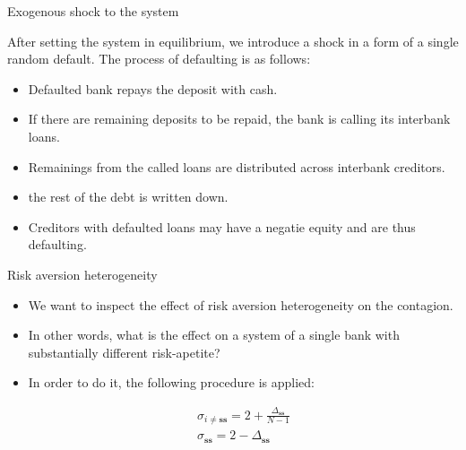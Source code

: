 \documentclass{beamer}
\begin{document}
\begin{frame}{Exogenous shock to the system}

    After setting the system in equilibrium, we introduce a shock in a form of a single random default. The process of defaulting is as follows:

    \begin{itemize}
        \item Defaulted bank repays the deposit with cash.
        \item If there are remaining deposits to be repaid, the bank is calling its interbank loans.
        \item Remainings from the called loans are distributed across interbank creditors.
        \item the rest of the debt is written down.
        \item Creditors with defaulted loans may have a negatie equity and are thus defaulting. 
    \end{itemize}
    
\end{frame}

\begin{frame}{Risk aversion heterogeneity}
    
    \begin{itemize}
        \item We want to inspect the effect of risk aversion heterogeneity on the contagion. 
        \item In other words, what is the effect on a system of a single bank with substantially different risk-apetite? 
        \item In order to do it, the following procedure is applied:
        
        \begin{equation}
            \begin{aligned}
              \sigma_{i \neq \textbf{ss}} = 2 + \frac{\Delta_{\textbf{ss}}}{N-1} \\ 
              \sigma_{\textbf{ss}} = 2 - \Delta_{\textbf{ss}}
            \end{aligned}\nonumber
        \end{equation}

    \end{itemize}

\end{frame}
\end{document}
